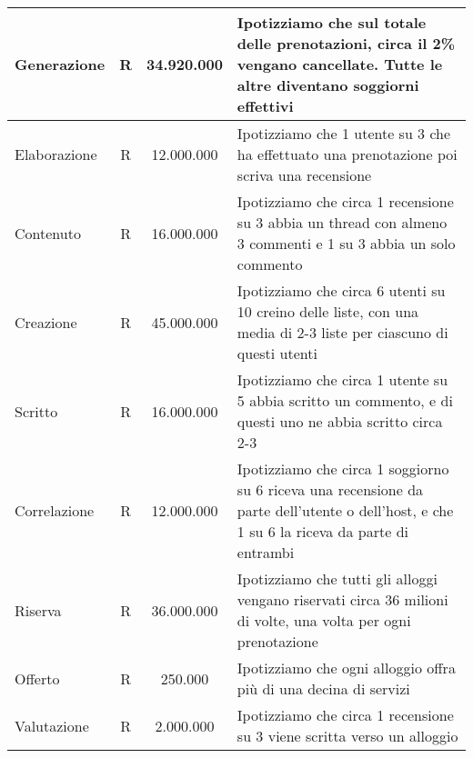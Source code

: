 \begin{longtable}{|l|c|c|p{6.2cm}|}
    Generazione              & R             & 34.920.000      & {Ipotizziamo che sul totale delle prenotazioni, circa il 2\% vengano cancellate. Tutte le altre diventano soggiorni effettivi}                                                        \\\hline
    Elaborazione             & R             & 12.000.000      & {Ipotizziamo che 1 utente su 3 che ha effettuato una prenotazione poi scriva una recensione}                                                                 \\\hline
    Contenuto                & R             & 16.000.000      & {Ipotizziamo che circa 1 recensione su 3 abbia un thread con almeno 3 commenti e 1 su 3 abbia un solo commento}                                                                   \\\hline
    Creazione                & R             & 45.000.000      & {Ipotizziamo che circa 6 utenti su 10 creino delle liste, con una media di 2-3 liste per ciascuno di questi utenti}                                                                     \\\hline
    Scritto                  & R             & 16.000.000      & {Ipotizziamo che circa 1 utente su 5 abbia scritto un commento, e di questi uno ne abbia scritto circa 2-3}                                                                        \\\hline
    Correlazione             & R             & 12.000.000      & {Ipotizziamo che circa 1 soggiorno su 6 riceva una recensione da parte dell'utente o dell'host, e che 1 su 6 la riceva da parte di entrambi}                                           \\\hline
    Riserva                  & R             & 36.000.000      & {Ipotizziamo che tutti gli alloggi vengano riservati circa 36 milioni di volte, una volta per ogni prenotazione}                                                               \\\hline
    Offerto                  & R             & 250.000         & {Ipotizziamo che ogni alloggio offra più di una decina di servizi}                                                                    \\\hline
    Valutazione              & R             & 2.000.000       & {Ipotizziamo che circa 1 recensione su 3 viene scritta verso un alloggio}                                                                   \\\hline
\end{longtable}

